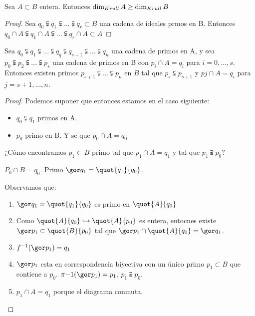 \begin{corol}
	Sea $A \subset B$ entera. Entonces $\dim_{Krull} A \geq \dim_{Krull} B$
\end{corol}

\begin{proof}
	Sea $q_0 \subsetneqq q_1 \subsetneqq ... \subsetneqq q_r \subset B$ una cadena de ideales prmos en B. Entonces $q_0\cap A \subsetneqq q_1\cap A \subsetneqq ... \subsetneqq q_r\cap A \subset A$
\end{proof}	


\begin{theorem}[Going-up]
	Sea $q_0 \subsetneqq q_1 \subsetneqq ... \subsetneqq q_q \subsetneqq q_{s+1} \subsetneqq ... \subsetneqq q_n$ una cadena de primos en A, y sea $p_0 \subsetneqq p_2 \subsetneqq ... \subsetneqq p_s$ una cadena de primos en B con $p_i \cap A=q_i $ para $i=0,...,s$. Entonces existen primos $p_{s+1} \subsetneqq ... \subsetneqq p_n$ en $B$ tal que $p_s \subsetneqq p_{s+1}$ y $pj \cap A = q_i$ para $j=s+1,...,n$.
\end{theorem}

\begin{proof}
	Podemos suponer que entonces estamos en el caso siguiente:
	\begin{itemize}
		\item $q_0 \subsetneqq q_1$ primos en A.
		\item $p_0$ primo en B. Y se que $p_0 \cap A=q_0$
	\end{itemize}
	
	¿Cómo encontramos $p_1 \subset B$ primo tal que $p_1 \cap A=q_1$ y tal que $p_1 \supsetneqq p_0$?
	
	
	$P_0 \cap B = q_0$. Primo $\cls{q_1}=\quot{q_1}{q_0}$.
	
	Observamos que:
	\begin{enumerate}
		\item $\cls{q_1}=\quot{q_1}{q_0}$ es primo en $\quot{A}{q_0}$
		\item Como $\quot{A}{q_0} \hookrightarrow \quot{A}{p_0}$ es entera, entocnes existe $\cls{p_1} \subset \quot{B}{p_0}$ tal que $\cls{p_1} \cap \quot{A}{q_0}=\cls{q_1}$. 
		\item $f^{-1}(\cls{p_1})=q_1$
		\item $\cls{p_1}$ esta en correspondencia biyectiva con un único primo $p_1 \subset B$ que contiene a $p_0$. $\pi{-1}(\cls{p_1})=p_1$, $p_1 \supseteqq p_0$.
		\item $p_1 \cap A=q_1$ porque el diagrama conmuta.
	\end{enumerate}
\end{proof}

